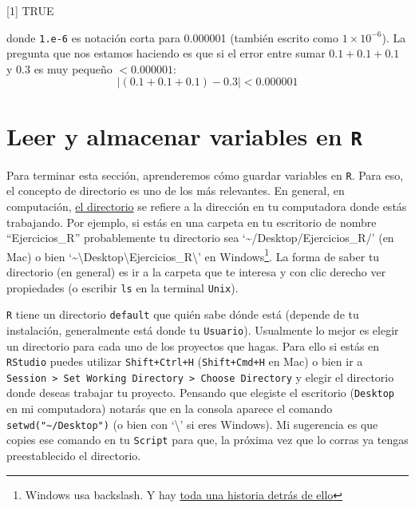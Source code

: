 \documentclass[
]{book}
\begin{document}
{[}1{]} TRUE

donde \texttt{1.e-6} es notación corta para 0.000001 (también escrito como \(1\times 10^{-6}\)). La pregunta que nos estamos haciendo es que si el error entre sumar \(0.1+0.1+0.1\) y \(0.3\) es muy pequeño \(< 0.000001\):
\[
| (0.1 + 0.1 + 0.1) - 0.3 | < 0.000001
\]

\hypertarget{leer-y-almacenar-variables-en-r}{%
\section{\texorpdfstring{Leer y almacenar variables en \texttt{R}}{Leer y almacenar variables en R}}\label{leer-y-almacenar-variables-en-r}}

Para terminar esta sección, aprenderemos cómo guardar variables en \texttt{R}. Para eso, el concepto de directorio es uno de los más relevantes. En general, en computación, \href{https://en.wikipedia.org/wiki/Working_directory}{el directorio} se refiere a la dirección en tu computadora donde estás trabajando. Por ejemplo, si estás en una carpeta en tu escritorio de nombre ``Ejercicios\_R'' probablemente tu directorio sea `\textasciitilde/Desktop/Ejercicios\_R/' (en Mac) o bien `\textasciitilde\textbackslash Desktop\textbackslash Ejercicios\_R\textbackslash{}' en Windows\footnote{Windows usa backslash. Y hay \href{https://www.howtogeek.com/181774/why-windows-uses-backslashes-and-everything-else-uses-forward-slashes/}{toda una historia detrás de ello}}. La forma de saber tu directorio (en general) es ir a la carpeta que te interesa y con clic derecho ver propiedades (o escribir \texttt{ls} en la terminal \texttt{Unix}).

\texttt{R} tiene un directorio \texttt{default} que quién sabe dónde está (depende de tu instalación, generalmente está donde tu \texttt{Usuario}). Usualmente lo mejor es elegir un directorio para cada uno de los proyectos que hagas. Para ello si estás en \texttt{RStudio} puedes utilizar \texttt{Shift+Ctrl+H} (\texttt{Shift+Cmd+H} en Mac) o bien ir a \texttt{Session\ \textgreater{}\ Set\ Working\ Directory\ \textgreater{}\ Choose\ Directory} y elegir el directorio donde deseas trabajar tu proyecto. Pensando que elegiste el escritorio (\texttt{Desktop} en mi computadora) notarás que en la consola aparece el comando \texttt{setwd("\textasciitilde{}/Desktop")} (o bien con `\textbackslash{}' si eres Windows). Mi sugerencia es que copies ese comando en tu \texttt{Script} para que, la próxima vez que lo corras ya tengas preestablecido el directorio.
\end{document}
